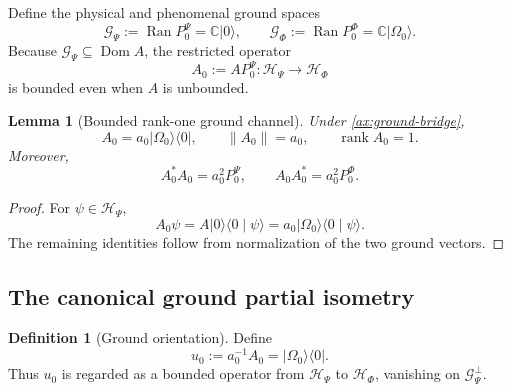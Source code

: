 \documentclass[11pt,reqno]{scrartcl}
\newcommand{\CC}{\mathbb C}
\newcommand{\scrHP}{\mathscr H_{\Psi}}
\newcommand{\scrHF}{\mathscr H_{\Phi}}
\newcommand{\PzeroP}{P_{0}^{\Psi}}
\newcommand{\PzeroF}{P_{0}^{\Phi}}
\newcommand{\GzeroP}{\mathscr G_{\Psi}}
\newcommand{\GzeroF}{\mathscr G_{\Phi}}
\newcommand{\Azero}{A_{0}}
\newcommand{\uzero}{u_{0}}
\newcommand{\ket}[1]{\lvert #1\rangle}
\newcommand{\bra}[1]{\langle #1\rvert}
\newcommand{\braket}[2]{\langle #1\mid #2\rangle}
\DeclareMathOperator{\Dom}{Dom}
\DeclareMathOperator{\Ran}{Ran}
\DeclareMathOperator{\rank}{rank}
\theoremstyle{plain}
\newtheorem{lemma}[lemma]{Lemma}
\theoremstyle{definition}
\newtheorem{definition}[definition]{Definition}
\theoremstyle{remark}
\begin{document}
Define the physical and phenomenal ground spaces
\begin{equation}
  \GzeroP:=\Ran\PzeroP=\CC\ket0,
  \qquad
  \GzeroF:=\Ran\PzeroF=\CC\ket{\Omega_0}.
  \label{eq:ground-spaces}
\end{equation}
Because \(\GzeroP\subseteq\Dom A\), the restricted operator
\begin{equation}
  \boxed{\Azero:=A\PzeroP:\scrHP\longrightarrow\scrHF}
  \label{eq:ground-channel-definition}
\end{equation}
is bounded even when \(A\) is unbounded.

\begin{lemma}[Bounded rank-one ground channel]
\label{lem:ground-channel-bounded}
Under \cref{ax:ground-bridge},
\begin{equation}
  \Azero=a_0\ket{\Omega_0}\!\bra0,
  \qquad
  \|\Azero\|=a_0,
  \qquad
  \rank\Azero=1.
  \label{eq:restricted-ground-channel-rank-one}
\end{equation}
Moreover,
\begin{equation}
  \Azero^*\Azero=a_0^2\PzeroP,
  \qquad
  \Azero\Azero^*=a_0^2\PzeroF.
  \label{eq:ground-channel-products}
\end{equation}
\end{lemma}

\begin{proof}
For \(\psi\in\scrHP\),
\begin{equation}
  \Azero\psi
  =A\ket0\braket{0}{\psi}
  =a_0\ket{\Omega_0}\braket{0}{\psi}.
\end{equation}
The remaining identities follow from normalization of the two ground
vectors.
\end{proof}

\subsection{The canonical ground partial isometry}

\begin{definition}[Ground orientation]
\label{def:ground-orientation}
Define
\begin{equation}
  \boxed{
  \uzero:=a_0^{-1}\Azero
  =\ket{\Omega_0}\!\bra0.}
  \label{eq:u0-definition}
\end{equation}
Thus \(\uzero\) is regarded as a bounded operator from \(\scrHP\) to
\(\scrHF\), vanishing on \(\GzeroP^\perp\).
\end{definition}
\end{document}
